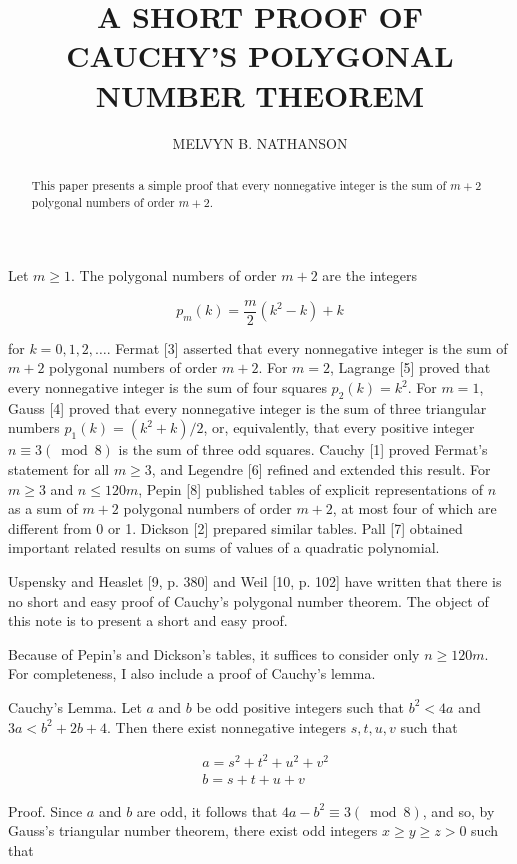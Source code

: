 \documentclass[10pt]{article}
\title{A SHORT PROOF OF CAUCHY'S POLYGONAL NUMBER THEOREM }
\author{MELVYN B. NATHANSON}
\date{}
\begin{document}
\maketitle


\begin{abstract}
This paper presents a simple proof that every nonnegative integer is the sum of $m+2$ polygonal numbers of order $m+2$.
\end{abstract}

Let $m \geqslant 1$. The polygonal numbers of order $m+2$ are the integers

$$
p_{m}(k)=\frac{m}{2}\left(k^{2}-k\right)+k
$$

for $k=0,1,2, \ldots$. Fermat [3] asserted that every nonnegative integer is the sum of $m+2$ polygonal numbers of order $m+2$. For $m=2$, Lagrange [5] proved that every nonnegative integer is the sum of four squares $p_{2}(k)=k^{2}$. For $m=1$, Gauss [4] proved that every nonnegative integer is the sum of three triangular numbers $p_{1}(k)=\left(k^{2}+k\right) / 2$, or, equivalently, that every positive integer $n \equiv 3(\bmod 8)$ is the sum of three odd squares. Cauchy [1] proved Fermat's statement for all $m \geqslant 3$, and Legendre [6] refined and extended this result. For $m \geqslant 3$ and $n \leqslant 120 m$, Pepin [8] published tables of explicit representations of $n$ as a sum of $m+2$ polygonal numbers of order $m+2$, at most four of which are different from 0 or 1. Dickson [2] prepared similar tables. Pall [7] obtained important related results on sums of values of a quadratic polynomial.

Uspensky and Heaslet [9, p. 380] and Weil [10, p. 102] have written that there is no short and easy proof of Cauchy's polygonal number theorem. The object of this note is to present a short and easy proof.

Because of Pepin's and Dickson's tables, it suffices to consider only $n \geqslant 120 m$. For completeness, I also include a proof of Cauchy's lemma.

Cauchy's Lemma. Let $a$ and $b$ be odd positive integers such that $b^{2}<4 a$ and $3 a<b^{2}+2 b+4$. Then there exist nonnegative integers $s, t, u, v$ such that


\begin{align*}
& a=s^{2}+t^{2}+u^{2}+v^{2}  \tag{1}\\
& b=s+t+u+v \tag{2}
\end{align*}


Proof. Since $a$ and $b$ are odd, it follows that $4 a-b^{2} \equiv 3(\bmod 8)$, and so, by Gauss's triangular number theorem, there exist odd integers $x \geqslant y \geqslant z>0$ such that
\end{document}
